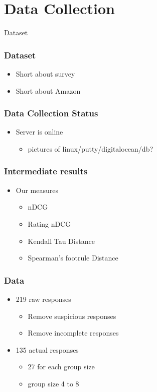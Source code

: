 \section{Data Collection}

\begin{frame}
     \begin{center}
     	\huge Dataset
     \end{center}
\end{frame}

\begin{frame}
\frametitle{Dataset}
\begin{itemize}
	\item Short about survey
	\item Short about Amazon
\end{itemize}
\end{frame}

\begin{frame}
\frametitle{Data Collection Status}
\begin{itemize}
	\item Server is online
	\begin{itemize}
		\item pictures of linux/putty/digitalocean/db?
	\end{itemize}
\end{itemize}
\end{frame}

\begin{frame}
\frametitle{Intermediate results}
\begin{itemize}
	\item Our measures
	\begin{itemize}
		\item nDCG
		\item Rating nDCG
		\item Kendall Tau Distance
		\item Spearman's footrule Distance
	\end{itemize}
\end{itemize}
\end{frame}

\begin{frame}
\frametitle{Data}
\begin{itemize}
	\item 219 raw responses
	\begin{itemize}
		\item Remove suspicious responses
		\item Remove incomplete responses
	\end{itemize}
	\item 135 actual responses
	\begin{itemize}
		\item 27 for each group size
		\item group size 4 to 8
	\end{itemize}
\end{itemize}
\end{frame}

